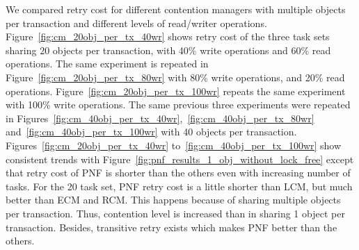 \documentclass[12pt,english]{report}
\begin{document}
We compared retry cost for different contention managers with multiple objects per transaction and different levels of read/writer operations. Figure~\ref{fig:cm_20obj_per_tx_40wr} shows retry cost of the three task sets sharing 20 objects per transaction, with 40\% write operations and 60\% read operations. The same experiment is repeated in Figure~\ref{fig:cm_20obj_per_tx_80wr} with 80\% write operations, and 20\% read operations. Figure~\ref{fig:cm_20obj_per_tx_100wr} repeats the same experiment with 100\% write operations. The same previous three experiments were repeated in Figures~\ref{fig:cm_40obj_per_tx_40wr},~\ref{fig:cm_40obj_per_tx_80wr} and~\ref{fig:cm_40obj_per_tx_100wr} with 40 objects per transaction. Figures~\ref{fig:cm_20obj_per_tx_40wr} to~\ref{fig:cm_40obj_per_tx_100wr} show consistent trends with Figure~\ref{fig:pnf_results_1_obj_without_lock_free} except that retry cost of PNF is shorter than the others even with increasing number of tasks. For the 20 task set, PNF retry cost is a little shorter than LCM, but much better than ECM and RCM. This happens because of sharing multiple objects per transaction. Thus, contention level is increased than in sharing 1 object per transaction. Besides, transitive retry exists which makes PNF better than the others.
\end{document}
